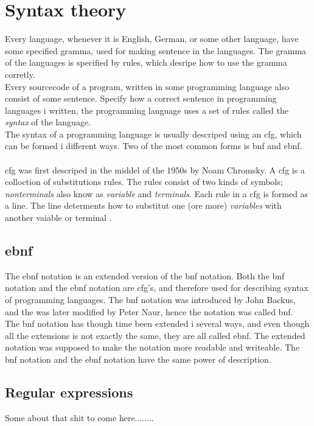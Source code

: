 \pagebreak
\section{Syntax theory}
Every language, whenever it is English, German, or some other language, have some specified gramma, used for making sentence in the languages. The gramma of the languages is specified by rules, which desripe how to use the gramma corretly. \\
Every sourcecode of a program, written in some programming language also consist of some sentence. Specify how a correct sentence in programming languages i written, the programming language uses a set of rules called the \textit{syntax} of the language. \\
The syntax of a programming language is usually descriped using an \ac{cfg}, which can be formed i different ways. Two of the most common forms is \ac{bnf} and \ac{ebnf}. \\
\\
\ac{cfg} was first descriped in the middel of the 1950s by Noam Chromsky. A \ac{cfg} is a colloction of substitutions rules. The rules consist of two kinds of symbols; \textit{nonterminals} also know as \textit{variable} and \textit{terminals}. Each rule in a \ac{cfg} is formed as a line. The line determents how to substitut one (ore more) \textit{variables} with another vaiable or terminal \cite{syntax_book}. \\

\subsection{\ac{ebnf}}
The \ac{ebnf} notation is an extended version of the \ac{bnf} notation. Both the \ac{bnf} notation and the \ac{ebnf} notation are \ac{cfg}'s, and therefore used for describing syntax of programming languages. The \ac{bnf} notation was introduced by John Backus, and the was later modified by Peter Naur, hence the notation was called \ac{bnf}. \\
The \ac{bnf} notation has though time been extended i several ways, and even though all the extensions is not exactly the same, they are all called \ac{ebnf}. The extended notation was supposed to make the notation more readable and writeable. The \ac{bnf} notation and the \ac{ebnf} notation have the same power of description. \cite{concepts_prog_lang}

\subsection{Regular expressions}
Some about that shit to come here........


